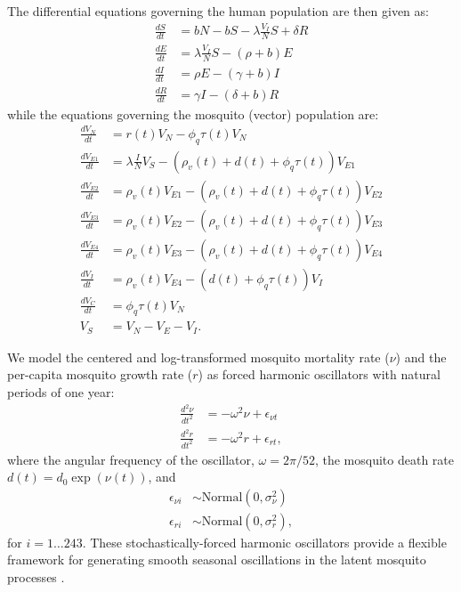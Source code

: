 \documentclass[10pt,letterpaper]{article}
\begin{document}
The differential equations governing the human population are then given as:
\begin{align} 
\frac{dS}{dt} &= bN - bS - \lambda \frac{V_{I}}{N} S + \delta R\\
\frac{dE}{dt} &= \lambda \frac{V_{I}}{N} S - (\rho + b)E\\
\frac{dI}{dt} &= \rho E - (\gamma + b)I\\
\frac{dR}{dt} &= \gamma I - (\delta + b)R
\end{align}
while the equations governing the mosquito (vector) population are:
\begin{align}
\frac{dV_N}{dt} & = r(t) V_N - \phi_q \tau(t) V_N \\
\frac{dV_{E1}}{dt} &= \lambda \frac{I}{N} V_S - (\rho_{v}(t) + d(t) + \phi_q \tau(t))V_{E1}\\
\frac{dV_{E2}}{dt} &= \rho_{v}(t) V_{E1} - (\rho_{v}(t) + d(t) + \phi_q \tau(t))V_{E2}\\
\frac{dV_{E3}}{dt} &= \rho_{v}(t) V_{E2}  - (\rho_{v}(t) + d(t) + \phi_q \tau(t))V_{E3}\\
\frac{dV_{E4}}{dt} &= \rho_{v}(t) V_{E3}  - (\rho_{v}(t) + d(t) + \phi_q \tau(t))V_{E4}\\
\frac{dV_I}{dt} &= \rho_{v}(t) V_{E4} - (d(t) + \phi_q \tau(t)) V_I\\
\frac{dV_C}{dt} & = \phi_q \tau(t) V_N\\
V_S &= V_N - V_E - V_I.
\end{align}

We model the centered and log-transformed mosquito mortality rate ($\nu$) and the per-capita mosquito growth rate ($r$) as forced harmonic oscillators with natural periods of one year:
\begin{align}
\frac{d^2\nu}{dt^2} &= -\omega^2 \nu + \epsilon_{\nu t}\\
\frac{d^2 r}{dt^2} &= -\omega^2 r + \epsilon_{rt},
\end{align}
where the angular frequency of the oscillator, $\omega = 2\pi / 52$, the mosquito death rate $d(t) = d_0 \exp(\nu(t))$, and
\begin{align}
\epsilon_{\nu i} & \sim \text{Normal}(0, \sigma^2_{\nu})\\
\epsilon_{ri} & \sim \text{Normal}(0, \sigma^2_r),
\end{align}
for $i = 1 \dots 243$.
These stochastically-forced harmonic oscillators provide a flexible framework for generating smooth seasonal oscillations in the latent mosquito processes \cite{Ramsay2017}.
\end{document}
